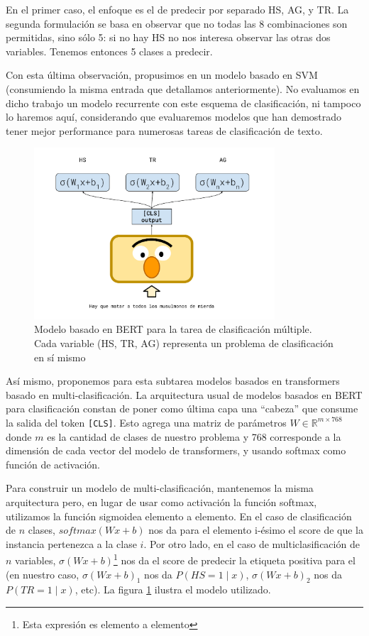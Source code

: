 En el primer caso, el enfoque es el de predecir por separado HS, AG, y TR. La segunda formulación se basa en observar que no todas las 8 combinaciones son permitidas, sino sólo 5: si no hay HS no nos interesa observar las otras dos variables. Tenemos entonces 5 clases a predecir.

Con esta última observación, propusimos en \citet{atalaya_tass2018} un modelo basado en SVM (consumiendo la misma entrada que detallamos anteriormente). No evaluamos en dicho trabajo un modelo recurrente con este esquema de clasificación, ni tampoco lo haremos aquí, considerando que evaluaremos modelos que han demostrado tener mejor performance para numerosas tareas de clasificación de texto.

\begin{figure}
    \centering
    \includegraphics[width=0.8\textwidth]{img/bert_model_hateval.pdf}
    \caption{Modelo basado en BERT para la tarea de clasificación múltiple. Cada variable (HS, TR, AG) representa un problema de clasificación en sí mismo}
    \label{fig:bert_hateval_classifier}
\end{figure}


Así mismo, proponemos para esta subtarea modelos basados en transformers basado en multi-clasificación. La arquitectura usual de modelos basados en BERT para clasificación constan de poner como última capa una  ``cabeza'' que consume la salida del token \verb|[CLS]|. Esto agrega una matriz de parámetros $W \in \mathbb{R}^{m \times 768}$ donde $m$ es la cantidad de clases de nuestro problema y 768 corresponde a la dimensión de cada vector del modelo de transformers, y usando softmax como función de activación.

Para construir un modelo de multi-clasificación, mantenemos la misma arquitectura pero, en lugar de usar como activación la función softmax, utilizamos la función sigmoidea elemento a elemento. En el caso de clasificación de $n$ clases, $softmax(W x + b)$ nos da para el elemento i-ésimo el score de que la instancia pertenezca a la clase $i$. Por otro lado, en el caso de multiclasificación de $n$ variables, $\sigma(W x + b)$\footnote{Esta expresión es elemento a elemento} nos da el score de predecir la etiqueta positiva para el (en nuestro caso,  $\sigma(W x + b)_1$ nos da $P( HS = 1 \mid x)$,  $\sigma(W x + b)_2$ nos da  $P(TR = 1 \mid x)$, etc). La figura \ref{fig:bert_hateval_classifier} ilustra el modelo utilizado.

